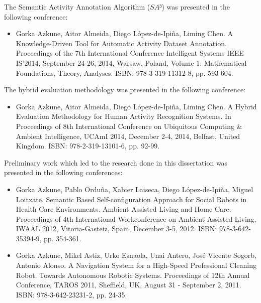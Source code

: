 The Semantic Activity Annotation Algorithm ($SA³$) was presented in the following conference:

\begin{itemize}
 \item Gorka Azkune, Aitor Almeida, Diego López-de-Ipiña, Liming Chen. A Knowledge-Driven Tool for Automatic Activity Dataset Annotation. Proceedings of the 7th International Conference Intelligent Systems IEEE IS’2014, September 24-26, 2014, Warsaw, Poland, Volume 1: Mathematical Foundations, Theory, Analyses. ISBN: 978-3-319-11312-8, pp. 593-604.
\end{itemize}

The hybrid evaluation methodology was presented in the following conference:

\begin{itemize}
 \item Gorka Azkune, Aitor Almeida, Diego López-de-Ipiña, Liming Chen. A Hybrid Evaluation Methodology for Human Activity Recognition Systems. In Proceedings of 8th International Conference on Ubiquitous Computing \& Ambient Intelligence, UCAmI 2014, December 2-4, 2014, Belfast, United Kingdom. ISBN: 978-2-319-13101-6, pp. 92-99.
\end{itemize}

Preliminary work which led to the research done in this dissertation was presented in the following conferences:

\begin{itemize}
 \item Gorka Azkune, Pablo Orduña, Xabier Laiseca, Diego López-de-Ipiña, Miguel Loitxate. Semantic Based Self-configuration Approach for Social Robots in Health Care Environments. Ambient Assisted Living and Home Care. Proceedings of 4th International Workconference on Ambient Assisted Living, IWAAL 2012, Vitoria-Gasteiz, Spain, December 3-5, 2012. ISBN: 978-3-642-35394-9, pp. 354-361.
 \item Gorka Azkune, Mikel Astiz, Urko Esnaola, Unai Antero, José Vicente Sogorb, Antonio Alonso. A Navigation System for a High-Speed Professional Cleaning Robot. Towards Autonomous Robotic Systems. Proceedings of 12th Annual Conference, TAROS 2011, Sheffield, UK, August 31 - September 2, 2011. ISBN: 978-3-642-23231-2, pp. 24-35.
\end{itemize}


